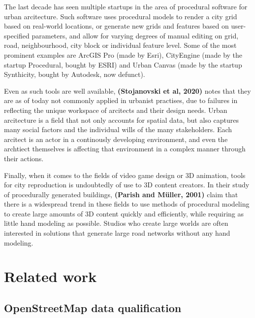 \documentclass{kththesis}
\begin{document}
The last decade has seen multiple startups in the area of procedural software for urban arcitecture.
Such software uses procedural models to render a city grid based on real-world locations, or generate new grids and features based on user-specified parameters, and allow for varying degrees of manual editing on grid, road, neighbourhood, city block or individual feature level.
Some of the most prominent examples are ArcGIS Pro (made by Esri), CityEngine (made by the startup Procedural, bought by ESRI) and Urban Canvas (made by the startup Synthicity, bought by Autodesk, now defunct).

Even as such tools are well available, \textbf{(Stojanovski et al, 2020)} notes that they are as of today not commonly applied in urbanist practises, due to failures in reflecting the unique workspace of arcitects and their design needs.
Urban arcitecture is a field that not only accounts for spatial data, but also captures many social factors and the individual wills of the many stakeholders.
Each arcitect is an actor in a continously developing environment, and even the archtiect themselves is affecting that environment in a complex manner through their actions.

Finally, when it comes to the fields of video game design or 3D animation, tools for city reproduction is undoubtedly of use to 3D content creators.
In their study of procedurally generated buildings, \textbf{(Parish and Müller, 2001)} claim that there is a widespread trend in these fields to use methods of procedural modeling to create large amounts of 3D content quickly and efficiently, while requiring as little hand modeling as possible.
Studios who create large worlds are often interested in solutions that generate large road networks without any hand modeling.

\section{Related work}

\subsection{OpenStreetMap data qualification}
\end{document}
